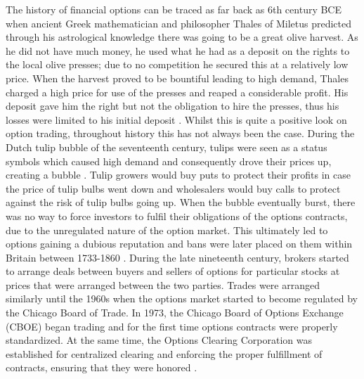 The history of financial options can be traced as far back as 6th century BCE when ancient Greek mathematician and philosopher Thales of Miletus predicted through his astrological knowledge there was going to be a great olive harvest. As he did not have much money, he used what he had as a deposit on the rights to the local olive presses; due to no competition he secured this at a relatively low price. When the harvest proved to be bountiful leading to high demand, Thales charged a high price for use of the presses and reaped a considerable profit. His deposit gave him the right but not the obligation to hire the presses, thus his losses were limited to his initial deposit \cite{OptionFirst, 1877aristotle}.
\nline
Whilst this is quite a positive look on option trading, throughout history this has not always been the case. During the Dutch tulip bubble of the seventeenth century, tulips were seen as a status symbols which caused high demand and consequently drove their prices up, creating a bubble \cite{dash2011tulipomania}. Tulip growers would buy puts to protect their profits in case the price of tulip bulbs went down and wholesalers would buy calls to protect against the risk of tulip bulbs going up. When the bubble eventually burst, there was no way to force investors to fulfil their obligations of the options contracts, due to the unregulated nature of the option market. This ultimately led to options gaining a dubious reputation and bans were later placed on them within Britain between 1733-1860 \cite{OptionBan}. 
\nline
During the late nineteenth century, brokers started to arrange deals between buyers and sellers of options for particular stocks at prices that were arranged between the two parties. Trades were arranged similarly until the 1960s when the options market started to become regulated by the Chicago Board of Trade. In 1973, the Chicago Board of Options Exchange (CBOE) began trading and for the first time options contracts were properly standardized. At the same time, the Options Clearing Corporation was established for centralized clearing and enforcing the proper fulfillment of contracts, ensuring that they were honored \cite{markham2002financial}.


